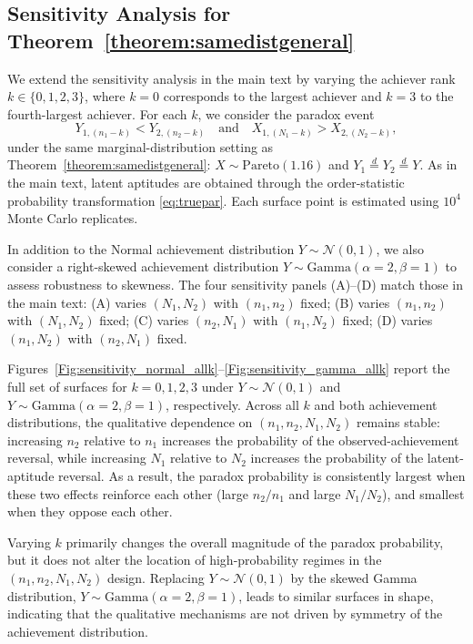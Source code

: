 \documentclass[12pt]{article}
\begin{document}
\subsection{Sensitivity Analysis for Theorem~\ref{theorem:samedistgeneral}}

We extend the sensitivity analysis in the main text by varying the achiever rank $k\in\{0,1,2,3\}$, where $k=0$ corresponds to the largest achiever and $k=3$ to the fourth-largest achiever. For each $k$, we consider the paradox event
\[
Y_{1,(n_1-k)}<Y_{2,(n_2-k)}
\quad\text{and}\quad
X_{1,(N_1-k)} > X_{2,(N_2-k)},
\]
under the same marginal-distribution setting as Theorem~\ref{theorem:samedistgeneral}: $X\sim\mathrm{Pareto}(1.16)$ and $Y_1\overset{d}{=}Y_2\overset{d}{=}Y$. As in the main text, latent aptitudes are obtained through the order-statistic probability transformation \eqref{eq:truepar}. Each surface point is estimated using $10^4$ Monte Carlo replicates.

In addition to the Normal achievement distribution $Y\sim\mathcal N(0,1)$, we also consider a right-skewed achievement distribution $Y\sim\mathrm{Gamma}(\alpha = 2,\beta = 1)$ to assess robustness to skewness. The four sensitivity panels (A)--(D) match those in the main text: (A) varies $(N_1,N_2)$ with $(n_1,n_2)$ fixed; (B) varies $(n_1,n_2)$ with $(N_1,N_2)$ fixed; (C) varies $(n_2,N_1)$ with $(n_1,N_2)$ fixed; (D) varies $(n_1,N_2)$ with $(n_2,N_1)$ fixed.

Figures~\ref{Fig:sensitivity_normal_allk}--\ref{Fig:sensitivity_gamma_allk} report the full set of surfaces for $k=0,1,2,3$ under $Y\sim\mathcal N(0,1)$ and $Y\sim\mathrm{Gamma}(\alpha = 2,\beta = 1)$, respectively. Across all $k$ and both achievement distributions, the qualitative dependence on $(n_1,n_2,N_1,N_2)$ remains stable: increasing $n_2$ relative to $n_1$ increases the probability of the observed-achievement reversal, while increasing $N_1$ relative to $N_2$ increases the probability of the latent-aptitude reversal. As a result, the paradox probability is consistently largest when these two effects reinforce each other (large $n_2/n_1$ and large $N_1/N_2$), and smallest when they oppose each other.

Varying $k$ primarily changes the overall magnitude of the paradox probability, but it does not alter the location of high-probability regimes in the $(n_1,n_2,N_1,N_2)$ design. Replacing $Y\sim\mathcal N(0,1)$ by the skewed Gamma distribution, $Y\sim\mathrm{Gamma}(\alpha = 2,\beta = 1)$, leads to similar surfaces in shape, indicating that the qualitative mechanisms are not driven by symmetry of the achievement distribution.
\end{document}
